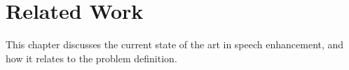\chapter{Related Work}
\label{chap:related-work}
This chapter discusses the current state of the art in speech enhancement, and how it relates to the problem definition.

\begingroup
\let\clearpage\relax




















\endgroup